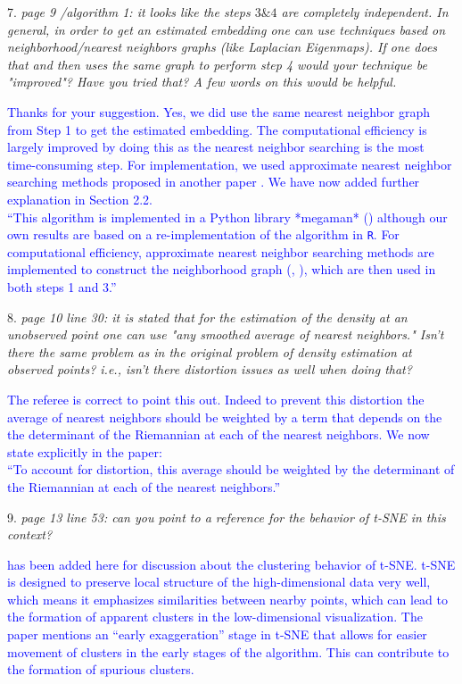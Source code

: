 \documentclass{article}
\begin{document}
7. \textit{page 9 /algorithm 1: it looks like the steps \(3 \& 4\) are completely independent. In general, in order to get an estimated embedding one can use techniques based on neighborhood/nearest neighbors graphs (like Laplacian Eigenmaps). If one does that and then uses the same graph to perform step 4 would your technique be "improved"? Have you tried that? A few words on this would be helpful.}

   \textcolor{blue}{Thanks for your suggestion. Yes, we did use the same nearest neighbor graph from Step 1 to get the estimated embedding. The computational efficiency is largely improved by doing this as the nearest neighbor searching is the most time-consuming step. For implementation, we used approximate nearest neighbor searching methods proposed in another paper \cite{Cheng2021-dh}. We have now added further explanation in Section 2.2. \\
  ``This algorithm is implemented in a Python library *megaman* (\cite{McQueen2016-xz}) although our own results are based on a re-implementation of the algorithm in \texttt{R}. For computational efficiency, approximate nearest neighbor searching methods are implemented to construct the neighborhood graph (\cite{Cheng2021-dh}, \cite{Perrault-Joncas2013-pq}), which are then used in both steps 1 and 3.''
   }

8. \textit{page 10 line 30: it is stated that for the estimation of the density at an unobserved point one can use "any smoothed average of nearest neighbors." Isn't there the same problem as in the original problem of density estimation at observed points? i.e., isn't there distortion issues as well when doing that?}

   \textcolor{blue}{The referee is correct to point this out. Indeed to prevent this distortion the average of nearest neighbors should be weighted by a term that depends on the the determinant of the Riemannian at each of the nearest neighbors. We now state explicitly in the paper:\\
   ``To account for distortion, this average should be weighted by the determinant of the Riemannian at each of the nearest neighbors.''}

9. \textit{page 13 line 53: can you point to a reference for the behavior of t-SNE in this context?}

   \textcolor{blue}{\autocite{cai2022-tsne} has been added here for discussion about the clustering behavior of t-SNE. t-SNE is designed to preserve local structure of the high-dimensional data very well, which means it emphasizes similarities between nearby points, which can lead to the formation of apparent clusters in the low-dimensional visualization. The paper mentions an ``early exaggeration'' stage in t-SNE that allows for easier movement of clusters in the early stages of the algorithm. This can contribute to the formation of spurious clusters.}
\end{document}
